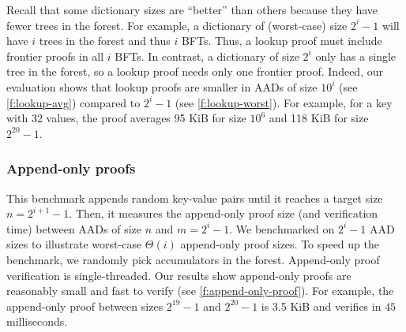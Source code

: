 Recall that some dictionary sizes are ``better'' than others because they have fewer trees in the forest.
For example, a dictionary of (worst-case) size $2^i - 1$ will have $i$ trees in the forest and thus $i$ BFTs.
Thus, a lookup proof must include frontier proofs in all $i$ BFTs.
In contrast, a dictionary of size $2^i$ only has a single tree in the forest, so a lookup proof needs only one {frontier proof}.
Indeed, our evaluation shows that lookup proofs are smaller in AADs of size $10^i$ (see \cref{f:lookup-avg}) compared to $2^i-1$ (see \cref{f:lookup-worst}).
For example, for a key with 32 values, the proof averages 95 KiB for size $10^6$ and 118 KiB for size $2^{20} - 1$.



\subsubsection{Append-only proofs}
\label{s:eval:append-only-proof}
This benchmark appends random key-value pairs until it reaches a target size $n = 2^{i+1} - 1$.
Then, it measures the append-only proof size (and verification time) between AADs of size $n$ and $m = 2^{i} - 1$.
We benchmarked on $2^{i}-1$ AAD sizes to illustrate worst-case $\Theta(i)$ append-only proof sizes.
To speed up the benchmark, we randomly pick accumulators in the forest.
Append-only proof verification is single-threaded.
Our results show append-only proofs are reasonably small and fast to verify (see \cref{f:append-only-proof}).
For example, the append-only proof between sizes $2^{19}-1$ and $2^{20}-1$ is 3.5 KiB and verifies in $45$ milliseconds.

